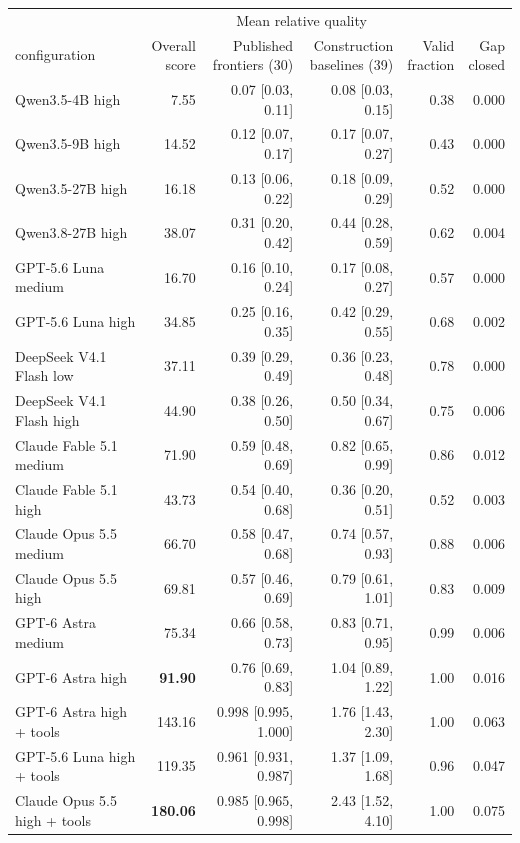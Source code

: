 \begin{tabular}{@{}lrrrrr@{}}
\toprule
& & \multicolumn{2}{c}{Mean relative quality} & & \\
\cmidrule(lr){3-4}
configuration & \shortstack{Overall\\score} & \shortstack{Published\\frontiers (30)} & \shortstack{Construction\\baselines (39)} & \shortstack{Valid\\fraction} & \shortstack{Gap\\closed} \\
\midrule
Qwen3.5-4B high & 7.55 & 0.07 [0.03, 0.11] & 0.08 [0.03, 0.15] & 0.38 & 0.000 \\
Qwen3.5-9B high & 14.52 & 0.12 [0.07, 0.17] & 0.17 [0.07, 0.27] & 0.43 & 0.000 \\
Qwen3.5-27B high & 16.18 & 0.13 [0.06, 0.22] & 0.18 [0.09, 0.29] & 0.52 & 0.000 \\
Qwen3.8-27B high & 38.07 & 0.31 [0.20, 0.42] & 0.44 [0.28, 0.59] & 0.62 & 0.004 \\
GPT-5.6 Luna medium & 16.70 & 0.16 [0.10, 0.24] & 0.17 [0.08, 0.27] & 0.57 & 0.000 \\
GPT-5.6 Luna high & 34.85 & 0.25 [0.16, 0.35] & 0.42 [0.29, 0.55] & 0.68 & 0.002 \\
DeepSeek V4.1 Flash low & 37.11 & 0.39 [0.29, 0.49] & 0.36 [0.23, 0.48] & 0.78 & 0.000 \\
DeepSeek V4.1 Flash high & 44.90 & 0.38 [0.26, 0.50] & 0.50 [0.34, 0.67] & 0.75 & 0.006 \\
Claude Fable 5.1 medium & 71.90 & 0.59 [0.48, 0.69] & 0.82 [0.65, 0.99] & 0.86 & 0.012 \\
Claude Fable 5.1 high & 43.73 & 0.54 [0.40, 0.68] & 0.36 [0.20, 0.51] & 0.52 & 0.003 \\
Claude Opus 5.5 medium & 66.70 & 0.58 [0.47, 0.68] & 0.74 [0.57, 0.93] & 0.88 & 0.006 \\
Claude Opus 5.5 high & 69.81 & 0.57 [0.46, 0.69] & 0.79 [0.61, 1.01] & 0.83 & 0.009 \\
GPT-6 Astra medium & 75.34 & 0.66 [0.58, 0.73] & 0.83 [0.71, 0.95] & 0.99 & 0.006 \\
GPT-6 Astra high & \textbf{91.90} & 0.76 [0.69, 0.83] & 1.04 [0.89, 1.22] & 1.00 & 0.016 \\
\midrule
GPT-6 Astra high + tools & 143.16 & 0.998 [0.995, 1.000] & 1.76 [1.43, 2.30] & 1.00 & 0.063 \\
GPT-5.6 Luna high + tools & 119.35 & 0.961 [0.931, 0.987] & 1.37 [1.09, 1.68] & 0.96 & 0.047 \\
Claude Opus 5.5 high + tools & \textbf{180.06} & 0.985 [0.965, 0.998] & 2.43 [1.52, 4.10] & 1.00 & 0.075 \\
\bottomrule
\end{tabular}
